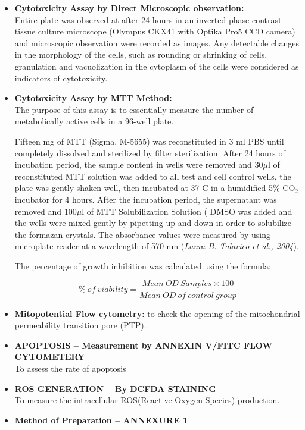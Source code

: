 \documentclass[11pt]{report} %
\begin{document}
\begin{itemize}
	\item \textbf{Cytotoxicity Assay by Direct Microscopic observation:} \\
	Entire plate was observed at after 24 hours in an inverted phase contrast tissue culture microscope (Olympus CKX41 with Optika Pro5 CCD camera) and microscopic observation were recorded as images.  Any detectable changes in the morphology of the cells, such as rounding or shrinking of cells, granulation and vacuolization in the cytoplasm of the cells were considered as indicators of cytotoxicity.  
	\item \textbf{Cytotoxicity Assay by MTT Method:} \\
	The purpose of this assay is to essentially measure the number of metabolically active cells in a 96-well plate.
	
	Fifteen mg of MTT (Sigma, M-5655) was reconstituted in 3 ml PBS until completely dissolved and sterilized by filter sterilization. After 24  hours of incubation period, the sample content in wells were removed and 30$\mu$l of reconstituted MTT solution was added to all test and cell control wells, the plate was gently shaken well, then incubated at 37$^{\circ}$C in a humidified 5\% CO$_2 $ incubator for 4 hours. After the incubation period, the supernatant was removed and 100$\mu$l of MTT Solubilization Solution ( DMSO was added and the wells were mixed gently by pipetting up and down  in order to solubilize the formazan crystals. The absorbance values were measured by using microplate reader at a wavelength of 570 nm (\textit{Laura B. Talarico et al., 2004}).
	
	The percentage of growth inhibition was calculated using the formula:
	
	\begin{equation}
	\label{eqn:viability}
	\%\ of\ viability = \frac{Mean\ OD\ Samples \times 100}{Mean\ OD\ of\ control\ group}
	\end{equation}
	
	\item \textbf{Mitopotential Flow cytometry:} to check the opening of the mitochondrial permeability transition pore (PTP).
	\item \textbf{APOPTOSIS – Measurement by ANNEXIN V/FITC FLOW CYTOMETERY} \\
	To assess the rate of apoptosis
	\item \textbf{ROS GENERATION – By DCFDA STAINING} \\
	To measure the intracellular ROS(Reactive Oxygen Species) production.
	\item \textbf{Method of Preparation – ANNEXURE 1}
\end{itemize}
\end{document}
